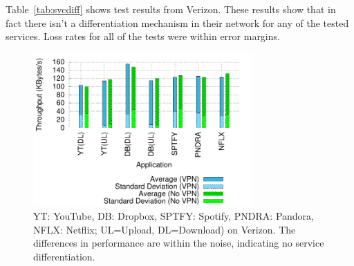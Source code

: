 \documentclass[letterpaper]{sig-alternate-10pt}
\begin{document}
Table~\ref{tab:svcdiff} shows test results from Verizon. These results show that in fact there isn't a differentiation mechanism in their network for any of the tested services. Loss rates for all of the tests were within error margins.
%

\begin{figure}[ht]
\centering
\includegraphics[width=3.3in]{figures/results}
\caption{YT: YouTube, DB: Dropbox, SPTFY: Spotify, PNDRA: Pandora, NFLX: Netflix; UL=Upload, DL=Download) on Verizon. The differences in performance are within the noise, indicating no service differentiation.}
\label{fig:dbu}
\end{figure}
\end{document}
